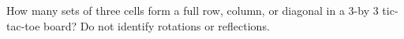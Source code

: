 How many sets of three cells form a full row, column, or diagonal in a 3-by 3 tic-tac-toe board? Do not identify rotations or reflections.
